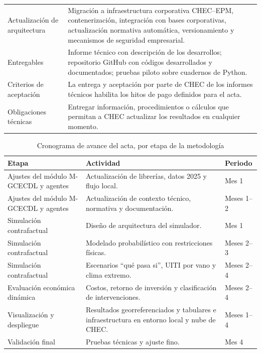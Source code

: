 \documentclass[11pt,a4paper]{article}
\begin{document}
\begin{small}
\begin{xltabular}{\textwidth}{L{4.2cm} X}
Actualización de arquitectura & Migración a infraestructura corporativa CHEC--EPM, contenerización, integración con bases corporativas, actualización normativa automática, versionamiento y mecanismos de seguridad empresarial. \\
Entregables & Informe técnico con descripción de los desarrollos; repositorio GitHub con códigos desarrollados y documentados; pruebas piloto sobre cuadernos de Python. \\
Criterios de aceptación & La entrega y aceptación por parte de CHEC de los informes técnicos habilita los hitos de pago definidos para el acta. \\
Obligaciones técnicas & Entregar información, procedimientos o cálculos que permitan a CHEC actualizar los resultados en cualquier momento. \\
\end{xltabular}
\end{small}

\begin{table}[H]
\centering
\caption{Cronograma de avance del acta, por etapa de la metodología}
\label{tab:cronograma}
\small
\begin{tabularx}{\textwidth}{L{4.6cm} X L{2.2cm}}
\toprule
\textbf{Etapa} & \textbf{Actividad} & \textbf{Periodo} \\
\midrule
Ajustes del módulo M-GCECDL y agentes & Actualización de librerías, datos 2025 y flujo local. & Mes 1 \\
Ajustes del módulo M-GCECDL y agentes & Actualización de contexto técnico, normativa y documentación. & Meses 1--2 \\
Simulación contrafactual & Diseño de arquitectura del simulador. & Mes 1 \\
Simulación contrafactual & Modelado probabilístico con restricciones físicas. & Meses 2--3 \\
Simulación contrafactual & Escenarios ``qué pasa si'', UITI por vano y clima extremo. & Meses 2--4 \\
Evaluación económica dinámica & Costos, retorno de inversión y clasificación de intervenciones. & Meses 2--4 \\
Visualización y despliegue & Resultados georreferenciados y tabulares e infraestructura en entorno local y nube de CHEC. & Meses 1--4 \\
Validación final & Pruebas técnicas y ajuste fino. & Mes 4 \\
\bottomrule
\end{tabularx}
\end{table}
\end{document}
